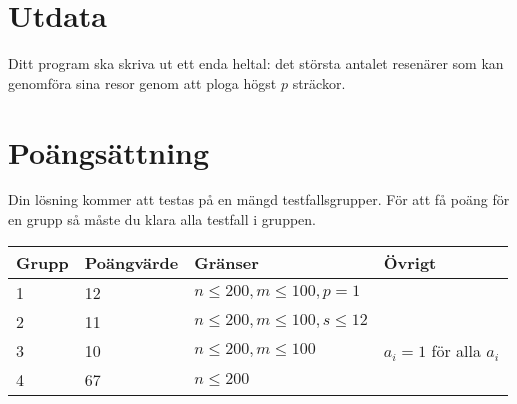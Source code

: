\section*{Utdata}
Ditt program ska skriva ut ett enda heltal: det största antalet resenärer som kan genomföra sina resor genom att ploga högst $p$ sträckor.

\section*{Poängsättning}
Din lösning kommer att testas på en mängd testfallsgrupper. För att få poäng för en grupp så måste du klara alla testfall i gruppen.

\begin{tabular}{| l | l | l | l |}
\hline
Grupp & Poängvärde & Gränser & Övrigt \\ \hline
1     & 12         & $ n \le 200, m \le 100, p = 1$ &\\ \hline
2     & 11         & $ n \le 200, m \le 100, s \le 12 $ &\\ \hline
3     & 10          & $ n \le 200, m \le 100$ & $a_i = 1$ för alla $a_i$\\ \hline
4     & 67         & $ n \le 200$ &\\ \hline
\end{tabular}
